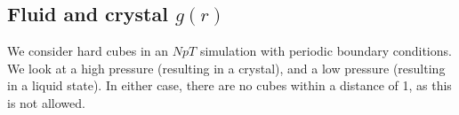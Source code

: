 \documentclass[thesis]{subfiles}
\begin{document}
%

\subsection{Fluid and crystal \texorpdfstring{$g(r)$}{g(r)}}




We consider hard cubes in an $NpT$ simulation with periodic boundary conditions. We look at a high pressure (resulting in a crystal), and a low pressure (resulting in a liquid state). In either case, there are no cubes within a distance of 1, as this is not allowed.
\end{document}
